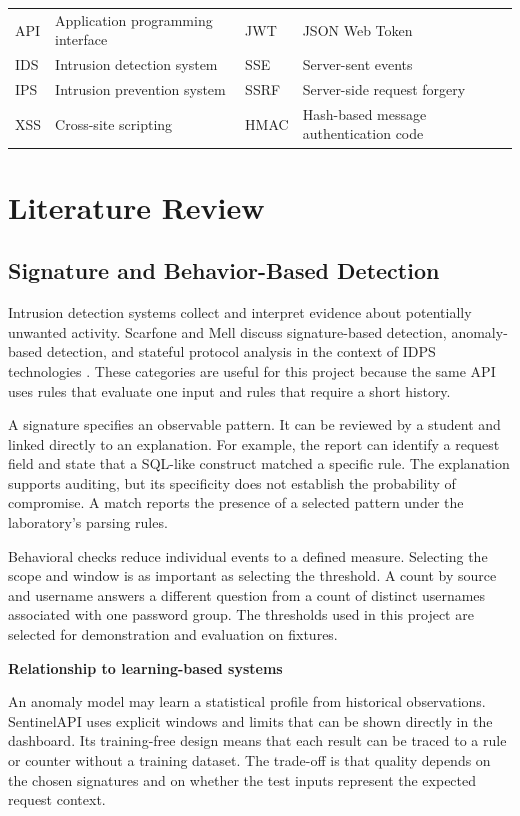 \documentclass[11pt,a4paper,oneside]{report}
\newcommand{\topic}[1]{\smallskip\noindent\textbf{#1}\par\nobreak\vspace{-.39em}}
\newcommand{\tabletitle}[1]{\captionof{table}{#1}\smallskip}
\begin{document}
\medskip
\tabletitle{Abbreviations used in the report}
\begin{tabularx}{\linewidth}{@{}lYlY@{}}\toprule
API & Application programming interface & JWT & JSON Web Token\\
IDS & Intrusion detection system & SSE & Server-sent events\\
IPS & Intrusion prevention system & SSRF & Server-side request forgery\\
XSS & Cross-site scripting & HMAC & Hash-based message authentication code\\
\bottomrule\end{tabularx}

\chapter{Literature Review}
\section{Signature and Behavior-Based Detection}
Intrusion detection systems collect and interpret evidence about potentially unwanted activity. Scarfone and Mell discuss signature-based detection, anomaly-based detection, and stateful protocol analysis in the context of IDPS technologies \cite{nist}. These categories are useful for this project because the same API uses rules that evaluate one input and rules that require a short history.

A signature specifies an observable pattern. It can be reviewed by a student and linked directly to an explanation. For example, the report can identify a request field and state that a SQL-like construct matched a specific rule. The explanation supports auditing, but its specificity does not establish the probability of compromise. A match reports the presence of a selected pattern under the laboratory's parsing rules.

Behavioral checks reduce individual events to a defined measure. Selecting the scope and window is as important as selecting the threshold. A count by source and username answers a different question from a count of distinct usernames associated with one password group. The thresholds used in this project are selected for demonstration and evaluation on fixtures.

\topic{Relationship to learning-based systems}
An anomaly model may learn a statistical profile from historical observations. SentinelAPI uses explicit windows and limits that can be shown directly in the dashboard. Its training-free design means that each result can be traced to a rule or counter without a training dataset. The trade-off is that quality depends on the chosen signatures and on whether the test inputs represent the expected request context.
\end{document}
